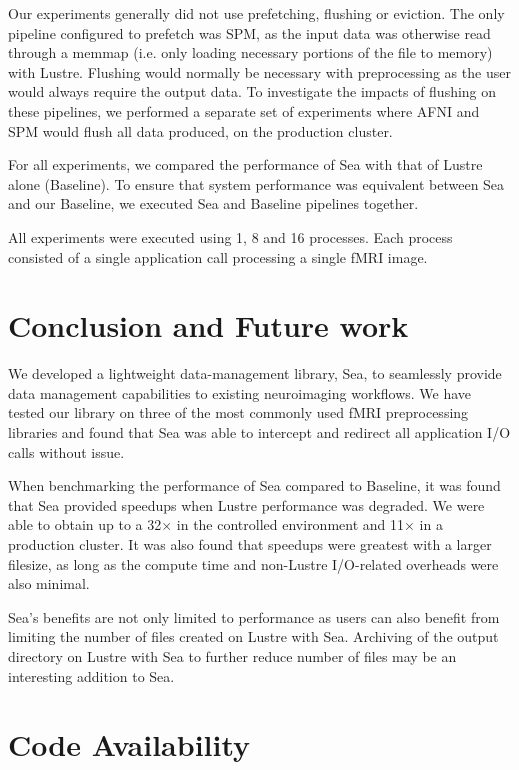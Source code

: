 \documentclass[fleqn,10pt]{wlscirep}
\begin{document}
    Our experiments generally did not use prefetching, flushing or eviction. The
    only pipeline configured to prefetch was SPM, as the input data was otherwise
    read through a memmap (i.e. only loading necessary portions of the file to memory) 
    with Lustre. Flushing would normally be necessary with
    preprocessing as the user would always require the output data. To
    investigate the impacts of flushing on these pipelines, we performed a
    separate set of experiments where AFNI and SPM would flush all data
    produced, on the production cluster.

    For all experiments, we compared the performance of Sea with that of Lustre
    alone (Baseline). To ensure that system performance was equivalent between
    Sea and our Baseline, we executed Sea and Baseline pipelines together.
    
    All experiments were executed using 1, 8 and 16 processes.
    Each process consisted of a single application call processing a single fMRI image.
    
    \section{Conclusion and Future work}

    We developed a lightweight data-management library, Sea, to seamlessly
    provide data management capabilities to existing neuroimaging workflows. We
    have tested our library on three of the most commonly used fMRI
    preprocessing libraries and found that Sea was able to intercept and
    redirect all application I/O calls without issue. 

    When benchmarking the performance of Sea compared to Baseline, it was found that Sea provided speedups
    when Lustre performance was degraded. We were able to obtain up to a
    32$\times$ in the controlled environment and 11$\times$ in a production
    cluster. It was also found that speedups were greatest with a larger
    filesize, as long as the compute time and non-Lustre I/O-related overheads
    were also minimal.

     Sea's benefits are not only limited to performance as
    users can also benefit from limiting the number of files created on Lustre
    with Sea. Archiving of the output directory on Lustre with Sea to further
    reduce number of files may be an interesting addition to Sea.

    \section{Code Availability}
\end{document}
